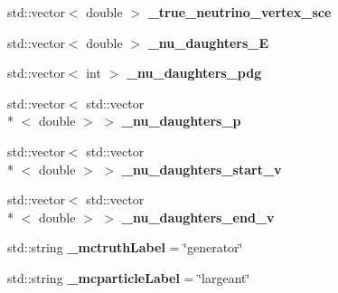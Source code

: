 \begin{DoxyCompactItemize}
\item 
\hypertarget{classlee_1_1ElectronNeutrinoFilter_a96d8f690fcc654c52df01d0740ddb4b0}{std\-::vector$<$ double $>$ {\bfseries \-\_\-true\-\_\-neutrino\-\_\-vertex\-\_\-sce}}\label{classlee_1_1ElectronNeutrinoFilter_a96d8f690fcc654c52df01d0740ddb4b0}

\item 
\hypertarget{classlee_1_1ElectronNeutrinoFilter_aae9f16e2d7a07b5e9b6f1ad4a0d498ab}{std\-::vector$<$ double $>$ {\bfseries \-\_\-nu\-\_\-daughters\-\_\-\-E}}\label{classlee_1_1ElectronNeutrinoFilter_aae9f16e2d7a07b5e9b6f1ad4a0d498ab}

\item 
\hypertarget{classlee_1_1ElectronNeutrinoFilter_aa8618e4d9a89d2a11a6a0e2f2587ee0b}{std\-::vector$<$ int $>$ {\bfseries \-\_\-nu\-\_\-daughters\-\_\-pdg}}\label{classlee_1_1ElectronNeutrinoFilter_aa8618e4d9a89d2a11a6a0e2f2587ee0b}

\item 
\hypertarget{classlee_1_1ElectronNeutrinoFilter_adadc9f67a7081c711beb31212f756c7e}{std\-::vector$<$ std\-::vector\\*
$<$ double $>$ $>$ {\bfseries \-\_\-nu\-\_\-daughters\-\_\-p}}\label{classlee_1_1ElectronNeutrinoFilter_adadc9f67a7081c711beb31212f756c7e}

\item 
\hypertarget{classlee_1_1ElectronNeutrinoFilter_a7abfee2964d910a5caf074bc53389453}{std\-::vector$<$ std\-::vector\\*
$<$ double $>$ $>$ {\bfseries \-\_\-nu\-\_\-daughters\-\_\-start\-\_\-v}}\label{classlee_1_1ElectronNeutrinoFilter_a7abfee2964d910a5caf074bc53389453}

\item 
\hypertarget{classlee_1_1ElectronNeutrinoFilter_a7877ffa0e396de6907ed7dca3e5c5e1d}{std\-::vector$<$ std\-::vector\\*
$<$ double $>$ $>$ {\bfseries \-\_\-nu\-\_\-daughters\-\_\-end\-\_\-v}}\label{classlee_1_1ElectronNeutrinoFilter_a7877ffa0e396de6907ed7dca3e5c5e1d}

\item 
\hypertarget{classlee_1_1ElectronNeutrinoFilter_a7b91ab5f148464be875c2eb4438d091c}{std\-::string {\bfseries \-\_\-mctruth\-Label} = \char`\"{}generator\char`\"{}}\label{classlee_1_1ElectronNeutrinoFilter_a7b91ab5f148464be875c2eb4438d091c}

\item 
\hypertarget{classlee_1_1ElectronNeutrinoFilter_af903bbd240a90b34caeb1eddf5313642}{std\-::string {\bfseries \-\_\-mcparticle\-Label} = \char`\"{}largeant\char`\"{}}\label{classlee_1_1ElectronNeutrinoFilter_af903bbd240a90b34caeb1eddf5313642}

\end{DoxyCompactItemize}


